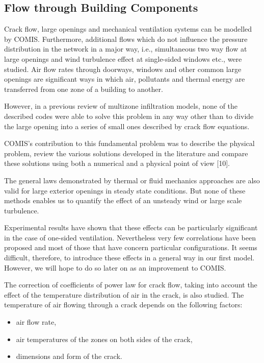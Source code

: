 \documentclass[10pt]{book}
\begin{document}
\subsection{Flow through Building Components}
Crack flow, large openings and mechanical ventilation systems can be modelled by COMIS. Furthermore, additional flows which do not influence the pressure distribution in the network in a major way, i.e., simultaneous two way flow at large openings and wind turbulence effect at single-sided windows etc., were studied. Air flow rates through doorways, windows and other common large openings are significant ways in which air, pollutants and thermal energy are transferred from one zone of a building to another.

However, in a previous review of multizone infiltration models, none of the described codes were able to solve this problem in any way other than to divide the large opening into a series of small ones described by crack flow equations.

COMIS's contribution to this fundamental problem was to describe the physical problem, review the various solutions developed in the literature and compare these solutions using both a numerical and a physical point of view [10].

The general laws demonstrated by thermal or fluid mechanics approaches are also valid for large exterior openings in steady state conditions. But none of these methods enables us to quantify the effect of an unsteady wind or large scale turbulence.

Experimental results have shown that these effects can be particularly significant in the case of one-sided ventilation. Nevertheless very few correlations have been proposed and most of those that have concern particular configurations. It seems difficult, therefore, to introduce these effects in a general way in our first model. However, we will hope to do so later on as an improvement to COMIS.

The correction of coefficients of power law for crack flow, taking into account the effect of the temperature distribution of air in the crack, is also studied. The temperature of air flowing through a crack depends on the following factors: 

\begin{itemize}
\item air flow rate,
\item air temperatures of the zones on both sides of the crack,
\item dimensions and form of the crack.
\end{itemize}
\end{document}
